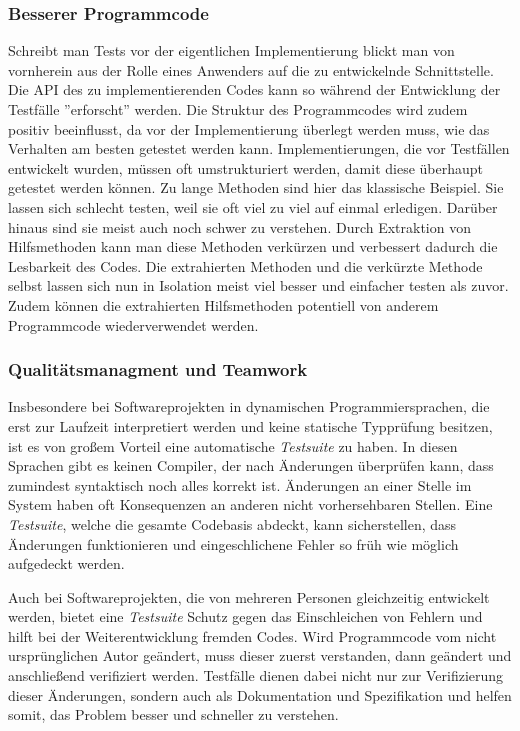 \subsubsection{Besserer Programmcode}
Schreibt man Tests vor der eigentlichen Implementierung blickt man von
vornherein aus der Rolle eines Anwenders auf die zu entwickelnde
Schnittstelle. Die API des zu implementierenden Codes kann so während
der Entwicklung der Testfälle ''erforscht'' werden. Die Struktur des
Programmcodes wird zudem positiv beeinflusst, da vor der
Implementierung überlegt werden muss, wie das Verhalten am besten
getestet werden kann. Implementierungen, die vor Testfällen entwickelt
wurden, müssen oft umstrukturiert werden, damit diese überhaupt
getestet werden können. Zu lange Methoden sind hier das klassische
Beispiel. Sie lassen sich schlecht testen, weil sie oft viel zu viel
auf einmal erledigen. Darüber hinaus sind sie meist auch noch schwer
zu verstehen. Durch Extraktion von Hilfsmethoden kann man diese
Methoden verkürzen und verbessert dadurch die Lesbarkeit des
Codes. Die extrahierten Methoden und die verkürzte Methode selbst
lassen sich nun in Isolation meist viel besser und einfacher testen
als zuvor. Zudem können die extrahierten Hilfsmethoden potentiell von
anderem Programmcode wiederverwendet werden.

\subsubsection{Qualitätsmanagment und Teamwork}
Insbesondere bei Softwareprojekten in dynamischen Programmiersprachen,
die erst zur Laufzeit interpretiert werden und keine statische
Typprüfung besitzen, ist es von großem Vorteil eine automatische
\textit{Testsuite} zu haben. In diesen Sprachen gibt es keinen Compiler, der
nach Änderungen überprüfen kann, dass zumindest syntaktisch noch alles
korrekt ist. Änderungen an einer Stelle im System haben oft
Konsequenzen an anderen nicht vorhersehbaren Stellen. Eine \textit{Testsuite},
welche die gesamte Codebasis abdeckt, kann sicherstellen, dass
Änderungen funktionieren und eingeschlichene Fehler so früh wie
möglich aufgedeckt werden.

Auch bei Softwareprojekten, die von mehreren Personen gleichzeitig
entwickelt werden, bietet eine \textit{Testsuite} Schutz gegen das
Einschleichen von Fehlern und hilft bei der Weiterentwicklung fremden
Codes. Wird Programmcode vom nicht ursprünglichen Autor geändert, muss
dieser zuerst verstanden, dann geändert und anschließend verifiziert
werden. Testfälle dienen dabei nicht nur zur Verifizierung dieser
Änderungen, sondern auch als Dokumentation und Spezifikation und
helfen somit, das Problem besser und schneller zu verstehen.

